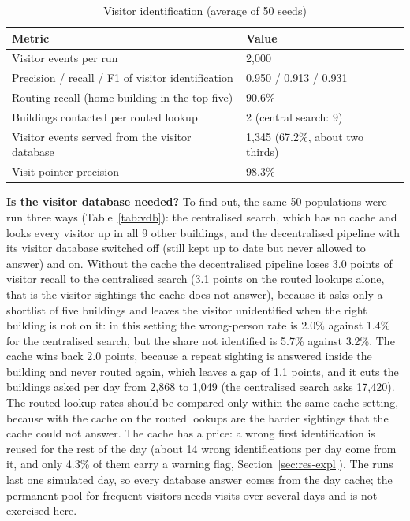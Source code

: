 \documentclass[12pt,a4paper,oneside]{report}
\begin{document}
\begin{table}[htbp]
\centering
\caption{Visitor identification (average of 50 seeds)}\label{tab:visitors}
{\small\setlength{\tabcolsep}{4pt}\renewcommand{\arraystretch}{1.2}
\begin{tabular}{|p{8.4cm}|p{3.0cm}|}\hline
\textbf{Metric} & \textbf{Value}\\\hline
Visitor events per run & 2,000\\\hline
Precision / recall / F1 of visitor identification & 0.950 / 0.913 / 0.931\\\hline
Routing recall (home building in the top five) & 90.6\%\\\hline
Buildings contacted per routed lookup & 2 (central search: 9)\\\hline
Visitor events served from the visitor database & 1,345 (67.2\%, about two thirds)\\\hline
Visit-pointer precision & 98.3\%\\\hline
\end{tabular}}
\end{table}

\textbf{Is the visitor database needed?} To find out, the same 50 populations were run three ways (Table~\ref{tab:vdb}): the centralised search, which has no cache and looks every visitor up in all 9 other buildings, and the decentralised pipeline with its visitor database switched off (still kept up to date but never allowed to answer) and on. Without the cache the decentralised pipeline loses 3.0 points of visitor recall to the centralised search (3.1 points on the routed lookups alone, that is the visitor sightings the cache does not answer), because it asks only a shortlist of five buildings and leaves the visitor unidentified when the right building is not on it: in this setting the wrong-person rate is 2.0\% against 1.4\% for the centralised search, but the share not identified is 5.7\% against 3.2\%. The cache wins back 2.0 points, because a repeat sighting is answered inside the building and never routed again, which leaves a gap of 1.1 points, and it cuts the buildings asked per day from 2,868 to 1,049 (the centralised search asks 17,420). The routed-lookup rates should be compared only within the same cache setting, because with the cache on the routed lookups are the harder sightings that the cache could not answer. The cache has a price: a wrong first identification is reused for the rest of the day (about 14 wrong identifications per day come from it, and only 4.3\% of them carry a warning flag, Section~\ref{sec:res-expl}). The runs last one simulated day, so every database answer comes from the day cache; the permanent pool for frequent visitors needs visits over several days and is not exercised here.
\end{document}
